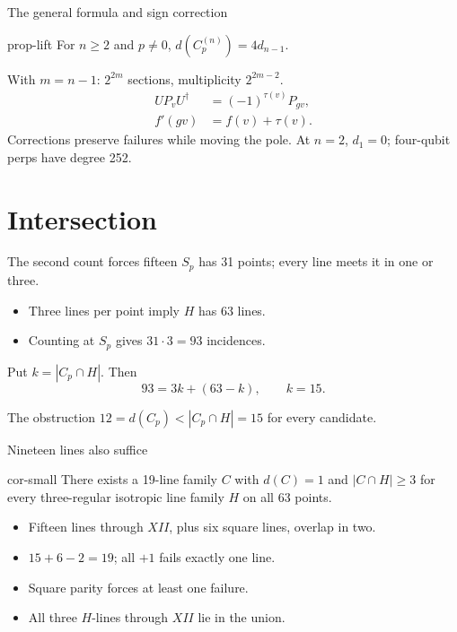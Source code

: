 \documentclass{beamer}
\begin{document}
\begin{frame}{The general formula and sign correction}
\begin{bookresult}{prop-lift}
For $n\ge2$ and $p\ne0$, $d(C_p^{(n)})=4d_{n-1}$.
\end{bookresult}
With $m=n-1$: $2^{2m}$ sections, multiplicity $2^{2m-2}$.
\[
\begin{aligned}
UP_vU^\dagger&=(-1)^{\tau(v)}P_{gv},\\
f'(gv)&=f(v)+\tau(v).
\end{aligned}
\]
Corrections preserve failures while moving the pole.
At $n=2$, $d_1=0$; four-qubit perps have degree 252.
\end{frame}
\section{Intersection}
\begin{frame}{The second count forces fifteen}
$S_p$ has 31 points; every line meets it in one or three.
\begin{itemize}
\item Three lines per point imply $H$ has 63 lines.
\item Counting at $S_p$ gives $31\cdot3=93$ incidences.
\end{itemize}
Put $k=|C_p\cap H|$. Then
\[93=3k+(63-k),\qquad k=15.\]
\begin{block}{The obstruction}
$12=d(C_p)<|C_p\cap H|=15$ for every candidate.
\end{block}
\end{frame}
\begin{frame}{Nineteen lines also suffice}
\begin{bookresult}{cor-small}
There exists a 19-line family $C$ with $d(C)=1$ and $|C\cap H|\ge3$ for every three-regular isotropic line family $H$ on all 63 points.
\end{bookresult}
\begin{itemize}
\item Fifteen lines through $XII$, plus six square lines, overlap in two.
\item $15+6-2=19$; all $+1$ fails exactly one line.
\item Square parity forces at least one failure.
\item All three $H$-lines through $XII$ lie in the union.
\end{itemize}
\end{frame}
\end{document}
